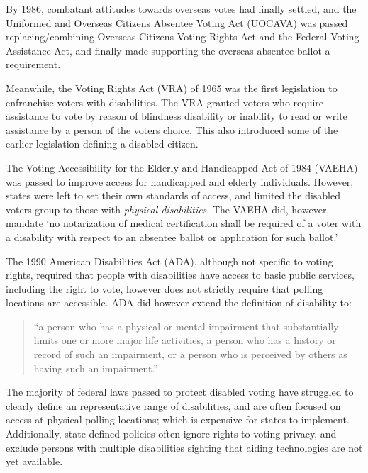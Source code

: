 By 1986, combatant attitudes towards overseas votes had finally settled, and the Uniformed and Overseas Citizens Absentee Voting Act (UOCAVA) was passed replacing/combining Overseas Citizens Voting Rights Act and the Federal Voting Assistance Act, and finally made supporting the overseas absentee ballot a requirement.

Meanwhile, the Voting Rights Act (VRA) of 1965 was the first legislation to enfranchise voters with disabilities. The VRA granted voters who require assistance to vote by reason of blindness disability or inability to read or write assistance by a person of the voters choice. This also introduced some of the earlier legislation defining a disabled citizen.

The Voting Accessibility for the Elderly and Handicapped Act of 1984 (VAEHA) was passed to improve access for handicapped and elderly individuals. However, states were left to set their own standards of access, and limited the disabled voters group to those with {\em physical disabilities}. The VAEHA did, however, mandate `no notarization of medical certification shall be required of a voter with a disability with respect to an absentee ballot or application for such ballot.'

The 1990 American Disabilities Act (ADA), although not specific to voting rights, required that people with disabilities have access to basic public services, including the right to vote, however does not strictly require that polling locations are accessible. ADA did however extend the definition of disability to:
\begin{quote}
``a person who has a physical or mental impairment that substantially limits one or more major life activities, a person who has a history or record of such an impairment, or a person who is perceived by others as having such an impairment.''
\end{quote}

The majority of federal laws passed to protect disabled voting have struggled to clearly define an representative range of disabilities, and are often focused on access at physical polling locations; which is expensive for states to implement. Additionally, state defined policies often ignore rights to voting privacy, and exclude persons with multiple disabilities sighting that aiding technologies are not yet available.


